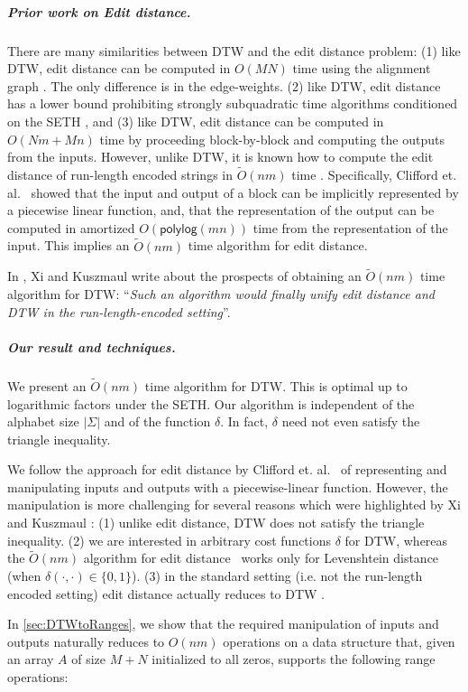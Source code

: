 \documentclass[10pt,a4paper]{article}
\newcommand{\para}[1]{\vspace{-0.1in} \subparagraph*{#1}}
\newcommand{\polylog}{\mathsf{polylog}}
\begin{document}
\para{Prior work on Edit distance.}
There are many similarities between DTW and the edit distance problem: (1)  
like DTW, edit distance can be computed
in $O(MN)$ time using the alignment graph \cite{vintzyuk1968,
  needleman1970general}. The only difference is in the edge-weights. (2) 
like DTW, edit distance has a lower bound prohibiting strongly
subquadratic time algorithms conditioned on the SETH \cite{DTWhard,
  DTWhard2,DBLP:conf/icalp/Kuszmaul19}, and (3) like DTW, edit distance can be computed in $O(Nm+Mn)$ time by proceeding block-by-block and computing the outputs from the inputs. However, unlike DTW, it is known how to compute the
edit distance of run-length encoded strings in $\tilde{O}(nm)$ time
\cite{rle1, rle2, rle3, rle4, rle5, rle6, rle7, rle8, rle9}. Specifically, Clifford et. al.~\cite{rle1} showed that the input and output of a block can be implicitly represented by a piecewise linear function, and, that the representation of the output can be computed in amortized $O(\polylog (mn))$ time from the representation of the input. This implies an $\tilde{O}(nm)$ time algorithm for edit distance. 

In \cite{DBLP:conf/esa/XiK22}, Xi and Kuszmaul  write about the prospects of obtaining an $\tilde{O}(nm)$ time algorithm for DTW: 
``{\em Such an
algorithm would finally unify edit distance and DTW in the
run-length-encoded setting}''. 

\para{Our result and techniques.}
 We present an $\tilde O(nm)$ time algorithm for DTW. This is optimal up to logarithmic factors under the SETH. Our algorithm is independent of the alphabet size $|\Sigma|$ and of the function $\delta$. In fact, $\delta$ need not even satisfy the triangle inequality. 
 
 We follow the approach for edit distance by Clifford et. al.~\cite{rle1} of representing and manipulating inputs and outputs with a piecewise-linear function. However, the manipulation is more challenging for several reasons which were highlighted by Xi and Kuszmaul \cite{DBLP:conf/esa/XiK22}: (1) unlike edit distance, DTW does not satisfy the triangle inequality. 
  (2) we are interested in arbitrary cost functions $\delta$ for DTW, whereas the $\tilde{O}(nm)$ algorithm for edit distance~\cite{rle1} works only for Levenshtein distance (when  $\delta(\cdot,\cdot) \in \{0,1\}$). 
  (3) in the standard setting (i.e. not the run-length encoded setting)  
edit
distance actually reduces to DTW
\cite{DBLP:conf/icalp/Kuszmaul19}. 

In \cref{sec:DTWtoRanges}, we show  that the required manipulation of inputs and outputs naturally reduces to $O(nm)$ operations on a data structure that, given an array $A$ of size $M+N$ initialized to all zeros, supports the following range operations:
 
\end{document}
